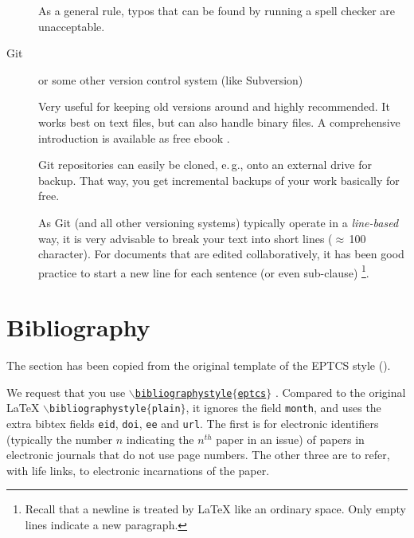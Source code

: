 \documentclass[]{rptuseminar}
\begin{document}
\begin{description}
		As a general rule, typos that can be found by running a spell checker are unacceptable.

	\item[Git] or some other version control system (like Subversion)

		Very useful for keeping old versions around and highly recommended.
		It works best on text files, but can also handle binary files.
		A comprehensive introduction is available as free ebook \cite{gitbook}.

		Git repositories can easily be cloned, e.\,g., onto an external drive for backup.
		That way, you get incremental backups of your work basically for free.

		As Git (and all other versioning systems) typically operate in a \emph{line-based} way,
		it is very advisable to break your text into short lines ($\approx$\,100 character).
		For documents that are edited collaboratively, it has been good practice to start a new line for each sentence (or even sub-clause)%
		\footnote{%
		  Recall that a newline is treated by \LaTeX{} like an ordinary space.
		  Only empty lines indicate a new paragraph.
		}.

\end{description}


\section{Bibliography}
The section has been copied from the original template of the EPTCS style (\cite{bibliographystylewebpage}).

We request that you use \href{http://eptcs.web.cse.unsw.edu.au/eptcs.bst}{\texttt{$\backslash$bibliographystyle$\{$eptcs$\}$}}
\cite{bibliographystylewebpage}.
Compared to the original {\LaTeX} \texttt{$\backslash$biblio\-graphystyle$\{$plain$\}$}, it ignores the field \texttt{month}, and uses the extra bibtex fields \texttt{eid}, \texttt{doi}, \texttt{ee} and \texttt{url}.
The first is for electronic identifiers (typically the number $n$ indicating the $n^{th}$ paper in an issue) of papers in electronic journals that do not use page numbers.
The other three are to refer, with life links, to electronic incarnations of the paper.
\end{document}
